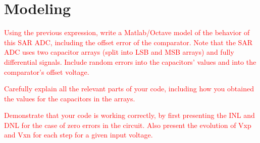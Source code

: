 \section{Modeling}

\textcolor{red}{Using the previous expression, write a Matlab/Octave model of the behavior of
this SAR ADC, including the offset error of the comparator. Note that the SAR
ADC uses two capacitor arrays (split into LSB and MSB arrays) and fully
differential signals. Include random errors into the capacitors’ values and into
the comparator’s offset voltage.}

\textcolor{red}{Carefully explain all the relevant parts of your code, including how you obtained the values for the capacitors in the arrays.}

\textcolor{red}{Demonstrate that your code is working correctly, by first presenting the INL and DNL for the case of zero errors in the circuit. Also present the evolution of Vxp and Vxn for each step for a given input voltage.}
